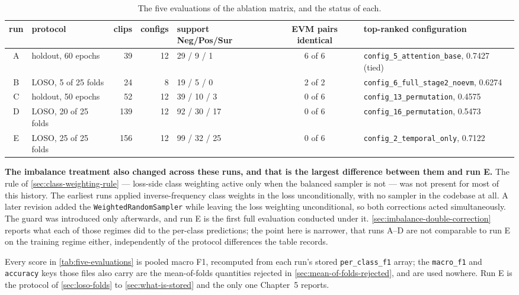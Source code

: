 \begin{table}[htbp]
	\centering
	\footnotesize
	\begin{tabular}{c l r r l c p{3.6cm}}
		\hline
		\textbf{run} & \textbf{protocol} & \textbf{clips} & \textbf{configs} & \textbf{support Neg/Pos/Sur} & \textbf{EVM pairs identical} & \textbf{top-ranked configuration} \\
		\hline
		A & holdout, 60 epochs      & 39  & 12 & 29 / 9 / 1    & 6 of 6 & \texttt{config\_5\_attention\_base}, 0.7427 (tied) \\
		B & LOSO, 5 of 25 folds     & 24  & 8  & 19 / 5 / 0    & 2 of 2 & \texttt{config\_6\_full\_stage2\_noevm}, 0.6274 \\
		C & holdout, 50 epochs      & 52  & 12 & 39 / 10 / 3   & 0 of 6 & \texttt{config\_13\_permutation}, 0.4575 \\
		D & LOSO, 20 of 25 folds    & 139 & 12 & 92 / 30 / 17  & 0 of 6 & \texttt{config\_16\_permutation}, 0.5473 \\
		E & LOSO, 25 of 25 folds    & 156 & 12 & 99 / 32 / 25  & 0 of 6 & \texttt{config\_2\_temporal\_only}, 0.7122 \\
		\hline
	\end{tabular}
	\caption[The five evaluations of the ablation matrix]{The five evaluations of the ablation matrix, and the status of each.}
	\label{tab:five-evaluations}
\end{table}

\textbf{The imbalance treatment also changed across these runs, and that is the largest difference between them and run E.} The rule of \autoref{sec:class-weighting-rule} --- loss-side class weighting active only when the balanced sampler is not --- was not present for most of this history. The earliest runs applied inverse-frequency class weights in the loss unconditionally, with no sampler in the codebase at all. A later revision added the \texttt{WeightedRandomSampler} while leaving the loss weighting unconditional, so both corrections acted simultaneously. The guard was introduced only afterwards, and run E is the first full evaluation conducted under it. \autoref{sec:imbalance-double-correction} reports what each of those regimes did to the per-class predictions; the point here is narrower, that runs A--D are not comparable to run E on the training regime either, independently of the protocol differences the table records.

Every score in \autoref{tab:five-evaluations} is pooled macro F1, recomputed from each run's stored \texttt{per\_class\_f1} array; the \texttt{macro\_f1} and \texttt{accuracy} keys those files also carry are the mean-of-folds quantities rejected in \autoref{sec:mean-of-folds-rejected}, and are used nowhere. Run E is the protocol of \autoref{sec:loso-folds} to \autoref{sec:what-is-stored} and the only one Chapter~5 reports.

